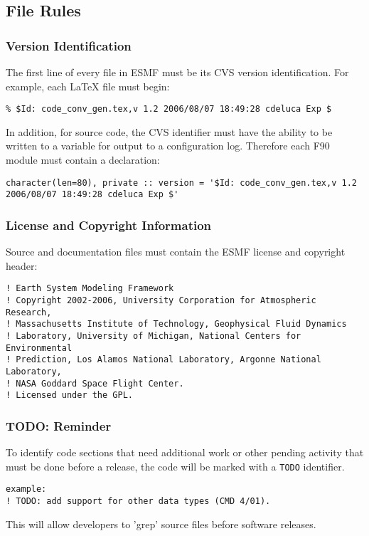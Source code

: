 \subsection{File Rules} 

\subsubsection{Version Identification} 
The first line of every file in ESMF
  must be its CVS version identification. For example, each \LaTeX
  file must begin:
\begin{verbatim}
% $Id: code_conv_gen.tex,v 1.2 2006/08/07 18:49:28 cdeluca Exp $ 
\end{verbatim}

In addition, for source code, the CVS identifier must have the 
ability to be written to a variable for output to a configuration log.  
Therefore each F90 module must contain a declaration:
\begin{verbatim}
character(len=80), private :: version = '$Id: code_conv_gen.tex,v 1.2 2006/08/07 18:49:28 cdeluca Exp $'
\end{verbatim}

\subsubsection{License and Copyright Information}

Source and documentation files must contain the ESMF license and 
copyright header:

\begin{verbatim}
! Earth System Modeling Framework
! Copyright 2002-2006, University Corporation for Atmospheric Research,
! Massachusetts Institute of Technology, Geophysical Fluid Dynamics
! Laboratory, University of Michigan, National Centers for Environmental
! Prediction, Los Alamos National Laboratory, Argonne National Laboratory,
! NASA Goddard Space Flight Center.
! Licensed under the GPL.
\end{verbatim}

\subsubsection{TODO: Reminder} 
To identify code sections that need
additional work or other pending activity that must be done before a release,
the code will be marked with a {\tt TODO} identifier. 
\begin{verbatim}
example:
! TODO: add support for other data types (CMD 4/01).
\end{verbatim}
This will allow developers to 'grep' source files before software releases. 

